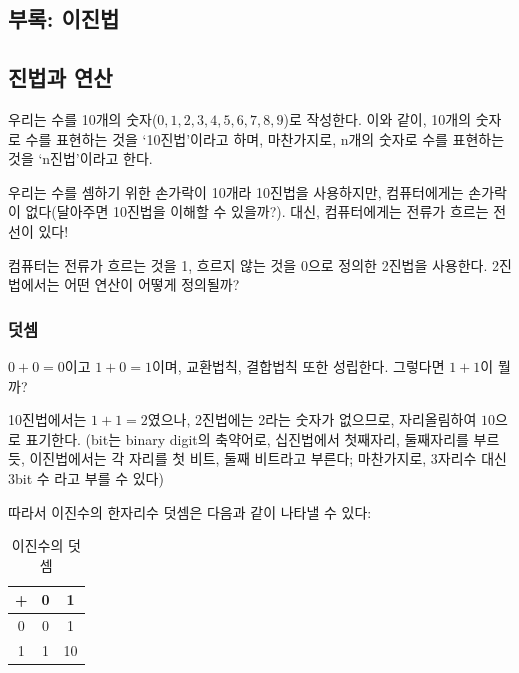 \documentclass[a4paper,12pt]{book}
\begin{document}
\begin{appendices}


\chapter{부록: 이진법}


\section{진법과 연산}
\label{sec:digit-oper}

    우리는 수를 10개의 숫자($0, 1, 2, 3, 4, 5, 6, 7, 8, 9$)로 작성한다.
    이와 같이, 10개의 숫자로 수를 표현하는 것을 `10진법'이라고 하며,
    마찬가지로, n개의 숫자로 수를 표현하는 것을 `n진법'이라고 한다.

    우리는 수를 셈하기 위한 손가락이 10개라 10진법을 사용하지만,
    컴퓨터에게는 손가락이 없다(달아주면 10진법을 이해할 수 있을까?).
    대신, 컴퓨터에게는 전류가 흐르는 전선이 있다!

    컴퓨터는 전류가 흐르는 것을 1, 흐르지 않는 것을 0으로 정의한 2진법을 사용한다.
    2진법에서는 어떤 연산이 어떻게 정의될까?


\subsection{덧셈}

    $0 + 0 = 0$이고 $1 + 0 = 1$이며, 교환법칙, 결합법칙 또한 성립한다.
    그렇다면 $1 + 1$이 뭘까?

    10진법에서는 $1 + 1 = 2$였으나, 2진법에는 2라는 숫자가 없으므로,
    자리올림하여 $10$으로 표기한다.
    (bit는 binary digit의 축약어로,
    십진법에서 첫째자리, 둘째자리를 부르듯,
    이진법에서는 각 자리를 첫 비트, 둘째 비트라고 부른다;
    마찬가지로, 3자리수 대신 3bit 수 라고 부를 수 있다)

    따라서 이진수의 한자리수 덧셈은 다음과 같이 나타낼 수 있다:

    \begin{table}[H]
        \centering

        \caption{이진수의 덧셈}
        \label{Tab:addition-binary}

        \begin{tabular}{ || c || c | c || }
            \hline
            + & 0  & 1  \\
            \hline\hline
            0 & 0  & 1  \\
            \hline
            1 & 1  & 10 \\
            \hline
        \end{tabular}
    \end{table}


\end{appendices}
\end{document}
